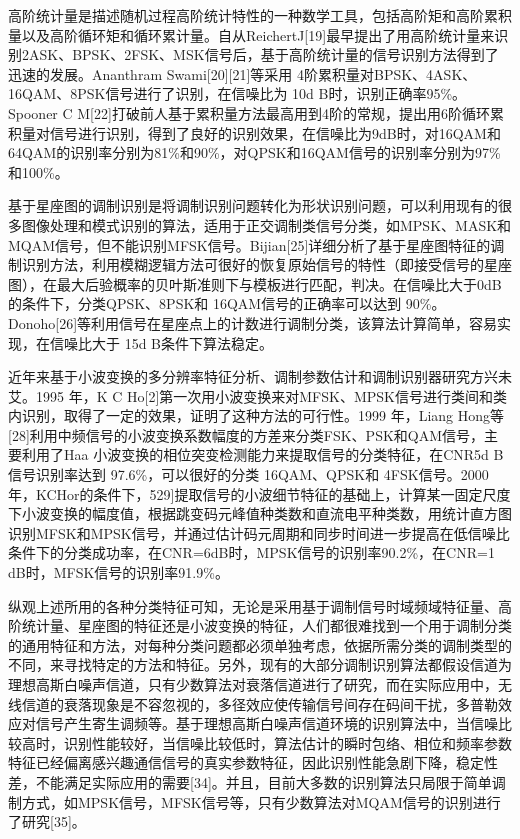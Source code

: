 高阶统计量是描述随机过程高阶统计特性的一种数学工具，包括高阶矩和高阶累积量以及高阶循环矩和循环累计量。自从ReichertJ[19]最早提出了用高阶统计量来识别2ASK、BPSK、2FSK、MSK信号后，基于高阶统计量的信号识别方法得到了迅速的发展。Ananthram Swami[20][21]等采用 4阶累积量对BPSK、4ASK、16QAM、8PSK信号进行了识别，在信噪比为 10d B时，识别正确率95\%。Spooner C M[22]打破前人基于累积量方法最高用到4阶的常规，提出用6阶循环累积量对信号进行识别，得到了良好的识别效果，在信噪比为9dB时，对16QAM和64QAM的识别率分别为81\%和90\%，对QPSK和16QAM信号的识别率分别为97\%和100\%。\par

基于星座图的调制识别是将调制识别问题转化为形状识别问题，可以利用现有的很多图像处理和模式识别的算法，适用于正交调制类信号分类，如MPSK、MASK和MQAM信号，但不能识别MFSK信号。Bijian[25]详细分析了基于星座图特征的调制识别方法，利用模糊逻辑方法可很好的恢复原始信号的特性（即接受信号的星座图），在最大后验概率的贝叶斯准则下与模板进行匹配，判决。在信噪比大于0dB的条件下，分类QPSK、8PSK和 16QAM信号的正确率可以达到 90\%。Donoho[26]等利用信号在星座点上的计数进行调制分类，该算法计算简单，容易实现，在信噪比大于 15d B条件下算法稳定。\par

近年来基于小波变换的多分辨率特征分析、调制参数估计和调制识别器研究方兴未艾。1995 年，K C Ho[2]第一次用小波变换来对MFSK、MPSK信号进行类间和类内识别，取得了一定的效果，证明了这种方法的可行性。1999 年，Liang Hong等[28]利用中频信号的小波变换系数幅度的方差来分类FSK、PSK和QAM信号，主要利用了Haa 小波变换的相位突变检测能力来提取信号的分类特征，在CNR5d B信号识别率达到 97.6\%，可以很好的分类 16QAM、QPSK和 4FSK信号。2000年，KCHor的条件下，529]提取信号的小波细节特征的基础上，计算某一固定尺度下小波变换的幅度值，根据跳变码元峰值种类数和直流电平种类数，用统计直方图识别MFSK和MPSK信号，并通过估计码元周期和同步时间进一步提高在低信噪比条件下的分类成功率，在CNR=6dB时，MPSK信号的识别率90.2\%，在CNR=1 dB时，MFSK信号的识别率91.9\%。
 
纵观上述所用的各种分类特征可知，无论是采用基于调制信号时域频域特征量、高阶统计量、星座图的特征还是小波变换的特征，人们都很难找到一个用于调制分类的通用特征和方法，对每种分类问题都必须单独考虑，依据所需分类的调制类型的不同，来寻找特定的方法和特征。另外，现有的大部分调制识别算法都假设信道为理想高斯白噪声信道，只有少数算法对衰落信道进行了研究，而在实际应用中，无线信道的衰落现象是不容忽视的，多径效应使传输信号间存在码间干扰，多普勒效应对信号产生寄生调频等。基于理想高斯白噪声信道环境的识别算法中，当信噪比较高时，识别性能较好，当信噪比较低时，算法估计的瞬时包络、相位和频率参数特征已经偏离感兴趣通信信号的真实参数特征，因此识别性能急剧下降，稳定性差，不能满足实际应用的需要[34]。并且，目前大多数的识别算法只局限于简单调制方式，如MPSK信号，MFSK信号等，只有少数算法对MQAM信号的识别进行了研究[35]。\par

